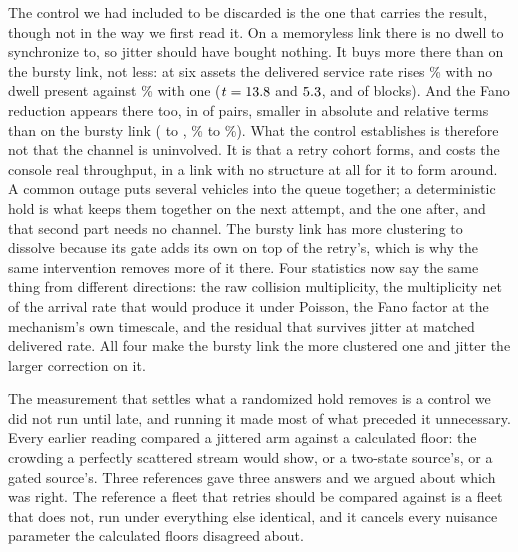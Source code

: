 \documentclass[11pt]{article}
\begin{document}
The control we had included to be discarded is the one that carries the result, though not in the way we first read it. On a memoryless link there is no dwell to synchronize to, so jitter should have bought nothing. It buys more there than on the bursty link, not less: at six assets the delivered service rate rises \jcMemSixRel\% with no dwell present against \jcGeSixRel\% with one ($t = 13.8{}$ and $5.3{}$, \jcMemSixBlocks{} and \jcGeSixBlocks{} of \jcMemSixN{} blocks). And the Fano reduction appears there too, in \frMemRed{} of \frMemPairs{} pairs, smaller in absolute and relative terms than on the bursty link (\frMemMin{} to \frMemMax{}, \frMemMinPct{}\% to \frMemMaxPct{}\%). What the control establishes is therefore not that the channel is uninvolved. It is that a retry cohort forms, and costs the console real throughput, in a link with no structure at all for it to form around. A common outage puts several vehicles into the queue together; a deterministic hold is what keeps them together on the next attempt, and the one after, and that second part needs no channel. The bursty link has more clustering to dissolve because its gate adds its own on top of the retry's, which is why the same intervention removes more of it there. Four statistics now say the same thing from different directions: the raw collision multiplicity, the multiplicity net of the arrival rate that would produce it under Poisson, the Fano factor at the mechanism's own timescale, and the residual that survives jitter at matched delivered rate. All four make the bursty link the more clustered one and jitter the larger correction on it.

The measurement that settles what a randomized hold removes is a control we did not run until late, and running it made most of what preceded it unnecessary. Every earlier reading compared a jittered arm against a calculated floor: the crowding a perfectly scattered stream would show, or a two-state source's, or a gated source's. Three references gave three answers and we argued about which was right. The reference a fleet that retries should be compared against is a fleet that does not, run under everything else identical, and it cancels every nuisance parameter the calculated floors disagreed about.
\end{document}
